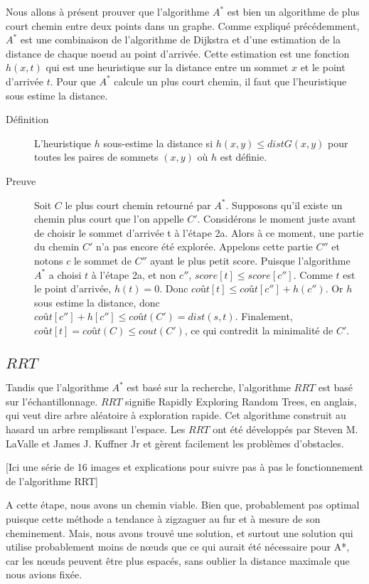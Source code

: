 \documentclass{article}
\begin{document}
Nous allons à présent prouver que l'algorithme $A^*$ est bien un algorithme de plus court chemin entre deux points dans un graphe. 
Comme expliqué précédemment, $A^*$ est une combinaison de l'algorithme de Dijkstra et d'une estimation de la distance de chaque noeud au point d'arrivée. Cette estimation est une fonction $h(x,t)$ qui est une heuristique sur la distance entre un sommet $x$ et le point d'arrivée $t$. Pour que $A^*$ calcule un plus court chemin, il faut que l'heuristique sous estime la distance. 
\begin{description}
\item[Définition] L'heuristique $h$ sous-estime la distance si $h(x,y) \leq distG(x,y)$ pour toutes les paires de sommets $(x,y)$ où $h$ est définie.
\item[Preuve] Soit $C$ le plus court chemin retourné par $A^*$. Supposons qu'il existe un chemin plus court que l'on appelle $C'$. 
Considérons le moment juste avant de choisir le sommet d'arrivée t à l'étape 2a. Alors à ce moment, une partie du chemin $C'$ n'a pas encore été explorée. Appelons cette partie $C''$ et notons $c$ le sommet de $C''$ ayant le plus petit score. 
Puisque l'algorithme $A^*$ a choisi $t$ à l'étape 2a, et non $c''$, $score[t] \leq score[c'']$.
Comme $t$ est le point d'arrivée, $h(t) = 0$. Donc $coût[t] \leq coût[c''] + h(c'')$. 
Or $h$ sous estime la distance, donc $coût[c''] + h[c''] \leq coût(C') = dist(s,t)$.
Finalement, $coût[t] = coût(C) \leq cout(C')$, ce qui contredit la minimalité de $C'$. 
\end{description}

\subsection{$RRT$}
Tandis que l’algorithme $A^*$ est basé sur la recherche, l’algorithme $RRT$ est basé sur l'échantillonnage. $RRT$ signifie Rapidly Exploring Random Trees, en anglais, qui veut dire arbre aléatoire à exploration rapide. Cet algorithme construit au hasard un arbre remplissant l’espace. Les $RRT$ ont été développés par Steven M. LaValle et James J. Kuffner Jr et gèrent facilement les problèmes d'obstacles. 

[Ici une série de 16 images et explications pour suivre pas à pas le fonctionnement de l'algorithme RRT]

A cette étape, nous avons un chemin viable. Bien que, probablement pas optimal puisque cette méthode a tendance à zigzaguer au fur et à mesure de son cheminement. Mais, nous avons trouvé une solution, et surtout une solution qui utilise probablement moins de nœuds que ce qui aurait été nécessaire pour A*, car les nœuds peuvent être plus espacés, sans oublier la distance maximale que nous avions fixée.
\end{document}
